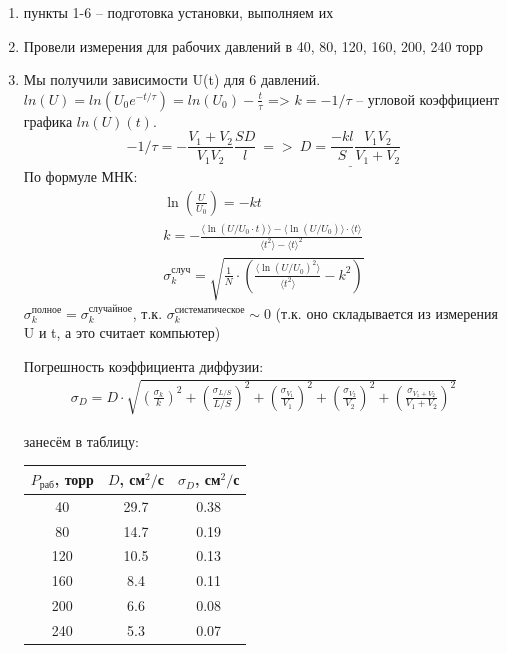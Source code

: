 \documentclass[11pt,a4paper]{article}
\begin{document}
\begin{enumerate}
  \item пункты 1-6 -- подготовка установки, выполняем их
  \setcounter{enumi}{6}
  \item Провели измерения для рабочих давлений в 40, 80, 120, 160, 200, 240 торр
  \item Мы получили зависимости U(t) для 6 давлений. $ln(U) = ln(U_0e^{-t/\tau}) = ln(U_0) - \frac{t}{\tau}$ =>
  $k = -1/\tau$ -- угловой коэффициент графика $ln(U)(t)$. 
  \begin{equation}
    -1/\tau = -\frac{V_1 + V_2}{V_1V_2}\frac{SD}{l}\ =>\ 
    \underline{D = \frac{-kl}{S} \frac{V_1V_2}{V_1 + V_2}}
  \end{equation} 
  По формуле МНК:
  \begin{gather}
    \ln \left(\frac{U}{U_0}\right) = -kt \\
    k = -\frac{\langle \ln (U/U_0 \cdot t)  \rangle - \langle \ln (U/U_0) \rangle \cdot \langle t \rangle}{\langle t^2 \rangle - {\langle t \rangle}^2} \\
    \sigma_k^{\text{случ}} = \sqrt{\frac{1}{N} \cdot \left(\frac{ \langle {\ln (U/U_0)}^2 \rangle}{\langle t^2 \rangle} - k^2 \right)}
  \end{gather}
  $\sigma_k^\text{полное} = \sigma_k^\text{случайное}$, т.к. $\sigma_k^\text{систематическое} \sim 0$
  (т.к. оно складывается из измерения U и t, а это считает компьютер)
  
  Погрешность коэффициента диффузии:
  \begin{gather}
    \sigma_D = D \cdot \sqrt{\left(\frac{\sigma_k}{k}\right)^2 + \left(\frac{\sigma_{L/S}}{L/S}\right)^2 + \left(\frac{\sigma_{V_1}}{V_1}\right)^2  + \left(\frac{\sigma_{V_2}}{V_2}\right)^2 + \left(\frac{\sigma_{V_1 + V_2}}{V_1 + V_2}\right)^2 }
  \end{gather}


  занесём в таблицу:
  \begin{table}[h!]
    \begin{center}
    \begin{tabular}{|c|c|c|}
    \hline
    $P_\text{раб}$, торр & $D$, см$^2/$с & $\sigma_D$, см$^2/$с \\ \hline
    40  & 29.7 & 0.38 \\ \hline
    80  & 14.7 & 0.19 \\ \hline
    120 & 10.5 & 0.13 \\ \hline
    160 & 8.4  & 0.11 \\ \hline
    200 & 6.6  & 0.08 \\ \hline
    240 & 5.3  & 0.07 \\ \hline
    \end{tabular}


\end{center}
\end{table}
\end{enumerate}
\end{document}
